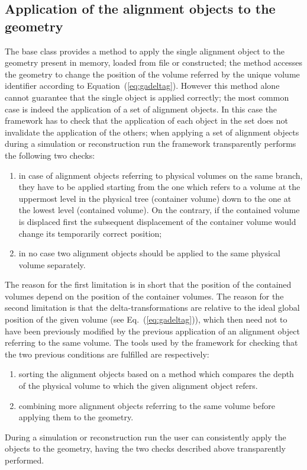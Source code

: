 \documentclass[12pt,a4paper,twoside]{article}
\begin{document}
{\subsection{Application of the alignment objects to the geometry}

The base class provides a method to apply the single alignment object
to the geometry present in memory, loaded from file or constructed;
the method accesses the geometry to change the position of the volume
referred by the unique volume identifier according to
Equation~(\ref{eq:gadeltag}).  However this method alone cannot
guarantee that the single object is applied correctly; the most common
case is indeed the application of a set of alignment objects. In this
case the framework has to check that the application of each object in
the set does not invalidate the application of the others; when
applying a set of alignment objects during a simulation or
reconstruction run the framework transparently performs the following
two checks:
\begin{enumerate}
\item in case of alignment objects referring to physical volumes on
  the same branch, they have to be applied starting from the one which
  refers to a volume at the uppermost level in the physical tree
  (container volume) down to the one at the lowest level (contained
  volume). On the contrary, if the contained volume is displaced first
  the subsequent displacement of the container volume would change its
  temporarily correct position;
\item in no case two alignment objects should be applied to the same
  physical volume separately.
\end{enumerate}
The reason for the first limitation is in short that the position of
the contained volumes depend on the position of the container volumes.
The reason for the second limitation is that the delta-transformations
are relative to the ideal global position of the given volume (see
Eq.~(\ref{eq:gadeltag})), which then need not to have been previously
modified by the previous application of an alignment object referring to
the same volume.
The tools used by the framework for checking that the two previous
conditions are fulfilled are respectively:
\begin{enumerate}
\item sorting the alignment objects based on a method which compares
  the depth of the physical
  volume to which the given alignment object refers.
\item combining more alignment objects referring to the same volume
  before applying them to the geometry.
\end{enumerate}
During a simulation or reconstruction run the user
can consistently apply the objects to the geometry, having the two
checks described above transparently performed.

}
\end{document}
